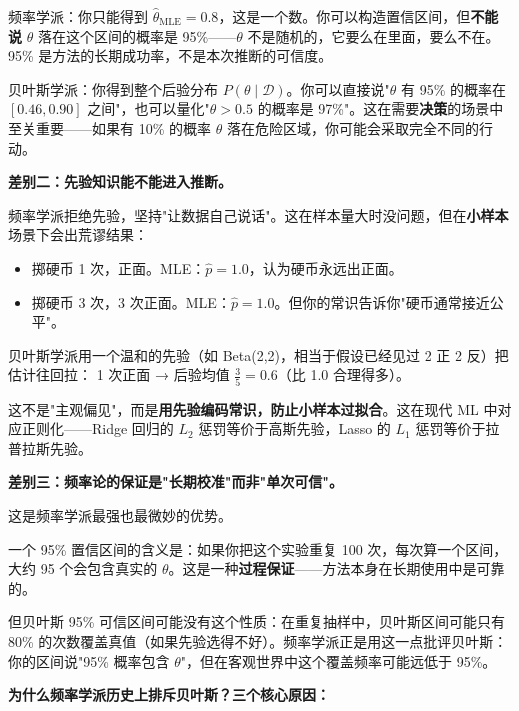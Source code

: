 频率学派：你只能得到 $\hat{\theta}_{\mathrm{MLE}} = 0.8$，这是一个数。你可以构造置信区间，但\textbf{不能说} $\theta$ 落在这个区间的概率是 95\%——$\theta$ 不是随机的，它要么在里面，要么不在。95\% 是方法的长期成功率，不是本次推断的可信度。

贝叶斯学派：你得到整个后验分布 $P(\theta \mid \mathcal{D})$。你可以直接说"$\theta$ 有 95\% 的概率在 $[0.46, 0.90]$ 之间"，也可以量化"$\theta > 0.5$ 的概率是 97\%"。这在需要\textbf{决策}的场景中至关重要——如果有 10\% 的概率 $\theta$ 落在危险区域，你可能会采取完全不同的行动。

\medskip
\textbf{差别二：先验知识能不能进入推断。}

频率学派拒绝先验，坚持"让数据自己说话"。这在样本量大时没问题，但在\textbf{小样本}场景下会出荒谬结果：

\begin{itemize}
    \item 掷硬币 1 次，正面。MLE：$\hat{p} = 1.0$，认为硬币永远出正面。
    \item 掷硬币 3 次，3 次正面。MLE：$\hat{p} = 1.0$。但你的常识告诉你"硬币通常接近公平"。
\end{itemize}

贝叶斯学派用一个温和的先验（如 Beta(2,2)，相当于假设已经见过 2 正 2 反）把估计往回拉：
1 次正面 → 后验均值 $\frac{3}{5} = 0.6$（比 1.0 合理得多）。

这不是"主观偏见"，而是\textbf{用先验编码常识，防止小样本过拟合}。这在现代 ML 中对应正则化——Ridge 回归的 $L_2$ 惩罚等价于高斯先验，Lasso 的 $L_1$ 惩罚等价于拉普拉斯先验。

\medskip
\textbf{差别三：频率论的保证是"长期校准"而非"单次可信"。}

这是频率学派最强也最微妙的优势。

一个 95\% 置信区间的含义是：如果你把这个实验重复 100 次，每次算一个区间，大约 95 个会包含真实的 $\theta$。这是一种\textbf{过程保证}——方法本身在长期使用中是可靠的。

但贝叶斯 95\% 可信区间可能没有这个性质：在重复抽样中，贝叶斯区间可能只有 80\% 的次数覆盖真值（如果先验选得不好）。频率学派正是用这一点批评贝叶斯：你的区间说"95\% 概率包含 $\theta$"，但在客观世界中这个覆盖频率可能远低于 95\%。

\medskip
\textbf{为什么频率学派历史上排斥贝叶斯？三个核心原因：}

